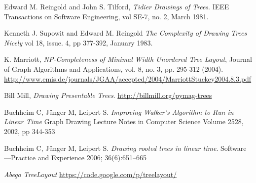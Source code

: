 \documentclass{report}
\begin{document}
\begin{thebibliography}{9}
  Edward M. Reingold and John S. Tilford,
  \emph{Tidier Drawings of Trees}.
  IEEE Transactions on Software Engineering, 
  vol SE-7, no. 2,
  March 1981.

  Kenneth J. Supowit and Edward M. Reingold
  \emph{The Complexity of Drawing Trees Nicely}
  vol 18, issue. 4, pp 377-392,
  January 1983.

  K. Marriott, 
  \emph{NP-Completeness of Minimal Width Unordered Tree Layout}, 
  Journal of Graph Algorithms and Applications, 
  vol. 8, no. 3, pp. 295-312 (2004).
  \url{http://www.emis.de/journals/JGAA/accepted/2004/MarriottStuckey2004.8.3.pdf}

  Bill Mill,
  \emph{Drawing Presentable Trees}.
  \url{http://billmill.org/pymag-trees}

  Buchheim C, J\"unger M, Leipert S. 
  \emph{Improving Walker's Algorithm to Run in Linear Time}
  Graph Drawing Lecture Notes in Computer Science Volume 2528, 
  2002, pp 344-353

  Buchheim C, J\"unger M, Leipert S. 
  \emph{Drawing rooted trees in linear time}. 
  Software—Practice and Experience 2006; 36(6):651–665

  \emph{Abego TreeLayout}
  \url{https://code.google.com/p/treelayout/}

\end{thebibliography}
\end{document}
